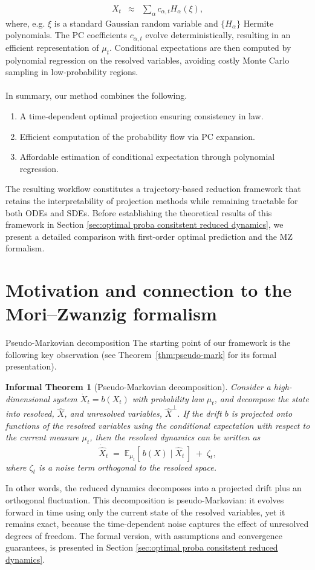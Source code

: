 \documentclass[11pt, a4paper, oneside, reqno]{amsart}
\makeatletter
\def\subsection{\@startsection{subsection}{2}%
	\z@{.5\linespacing\@plus.7\linespacing}{.5\linespacing}%
	{\normalfont\large\bfseries}}
\newtheorem*{informaltheorem}{Informal Theorem}
\makeatother
\begin{document}
\begin{eqnarray}
X_t &\approx& \sum_{\alpha} c_{\alpha,t} H_\alpha(\xi),
\end{eqnarray}
where, e.g. $\xi$ is a standard Gaussian random variable and $\{H_\alpha\}$ Hermite polynomials. The PC coefficients $c_{\alpha,t}$ evolve deterministically, resulting in an efficient representation of $\mu_t$. Conditional expectations are then computed by polynomial regression on the resolved variables, avoiding costly Monte Carlo sampling in low-probability regions. \\ \ \\
In summary, our method combines the following.
\begin{enumerate}
\item  A time-dependent optimal projection ensuring consistency in law.
\item Efficient computation of the probability flow via PC expansion. 
\item Affordable estimation of conditional expectation through polynomial regression. 
\end{enumerate}
The resulting workflow constitutes a trajectory-based reduction framework that retains the interpretability of projection methods while remaining  tractable for both ODEs and SDEs. Before establishing the theoretical results of this framework in Section \ref{sec:optimal proba consitstent reduced dynamics}, we present a detailed comparison with first-order optimal prediction and the MZ formalism.
\section{Motivation and connection to the Mori–Zwanzig formalism}\label{sec:MZ}
\subsection{Pseudo-Markovian decomposition}
\noindent The starting point of our framework is the following key observation (see Theorem~\ref{thm:pseudo-mark} for its formal presentation). 
\begin{informaltheorem}[Pseudo-Markovian decomposition]
Consider a high-dimensional system $\dot{X}_t=b(X_t)$ with probability law $\mu_t$, and decompose the state  into resolved, $\hat{X}$, and unresolved variables, $\hat{X}^{\perp}$.  
If the drift $b$ is projected onto functions of the resolved variables using the conditional expectation with respect to the current measure $\mu_t$, then the resolved dynamics can be written as
\[
\dot{\hat{X}}_t \;=\; \mathbb{E}_{\mu_t}[\,{b}(X)\mid \hat{X}_t\,] \;+\; \zeta_t,
\]
where $\zeta_t$ is a noise term orthogonal to the resolved space.  
\end{informaltheorem}
\noindent In other words, the reduced dynamics decomposes into a projected drift plus an orthogonal fluctuation. This decomposition is {pseudo-Markovian}: it evolves forward in time using only the current state of the resolved variables, yet it remains exact, because the time-dependent noise captures the effect of unresolved degrees of freedom.   The formal version, with assumptions and convergence guarantees, is presented in Section \ref{sec:optimal proba consitstent reduced dynamics}. 
\end{document}
